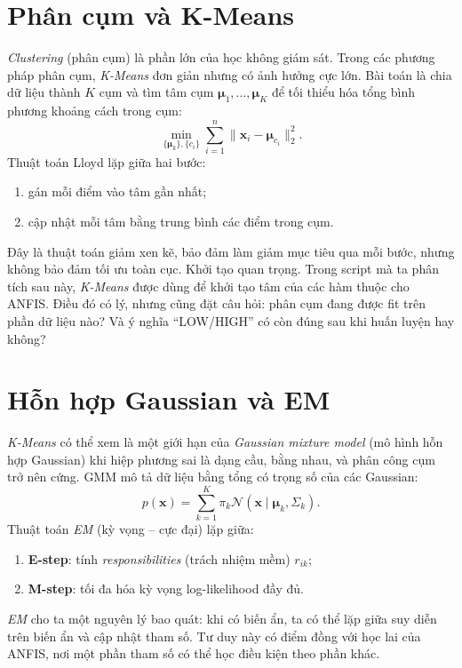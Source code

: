 \section{Phân cụm và K-Means}

\emph{Clustering} (phân cụm) là phần lớn của học không giám sát. Trong các phương pháp phân cụm, \emph{K-Means} đơn giản nhưng có ảnh hưởng cực lớn. Bài toán là chia dữ liệu thành \(K\) cụm và tìm tâm cụm \(\bm{\mu}_1,\dots,\bm{\mu}_K\) để tối thiểu hóa tổng bình phương khoảng cách trong cụm:
\[
\min_{\{\bm{\mu}_k\},\{c_i\}} \sum_{i=1}^n \|\bm{x}_i-\bm{\mu}_{c_i}\|_2^2.
\]
Thuật toán Lloyd lặp giữa hai bước:

\begin{enumerate}
\item gán mỗi điểm vào tâm gần nhất;
\item cập nhật mỗi tâm bằng trung bình các điểm trong cụm.
\end{enumerate}

Đây là thuật toán giảm xen kẽ, bảo đảm làm giảm mục tiêu qua mỗi bước, nhưng không bảo đảm tối ưu toàn cục. Khởi tạo quan trọng. Trong script mà ta phân tích sau này, \emph{K-Means} được dùng để khởi tạo tâm của các hàm thuộc cho ANFIS. Điều đó có lý, nhưng cũng đặt câu hỏi: phân cụm đang được fit trên phần dữ liệu nào? Và ý nghĩa ``LOW/HIGH'' có còn đúng sau khi huấn luyện hay không?

\section{Hỗn hợp Gaussian và EM}

\emph{K-Means} có thể xem là một giới hạn của \emph{Gaussian mixture model} (mô hình hỗn hợp Gaussian) khi hiệp phương sai là dạng cầu, bằng nhau, và phân công cụm trở nên cứng. GMM mô tả dữ liệu bằng tổng có trọng số của các Gaussian:
\[
p(\bm{x})=\sum_{k=1}^K \pi_k \mathcal{N}(\bm{x}\mid \bm{\mu}_k,\Sigma_k).
\]
Thuật toán \emph{EM} (kỳ vọng -- cực đại) lặp giữa:

\begin{enumerate}
\item \textbf{E-step}: tính \emph{responsibilities} (trách nhiệm mềm) \(r_{ik}\);
\item \textbf{M-step}: tối đa hóa kỳ vọng log-likelihood đầy đủ.
\end{enumerate}

\emph{EM} cho ta một nguyên lý bao quát: khi có biến ẩn, ta có thể lặp giữa suy diễn trên biến ẩn và cập nhật tham số. Tư duy này có điểm đồng với học lai của ANFIS, nơi một phần tham số có thể học điều kiện theo phần khác.

